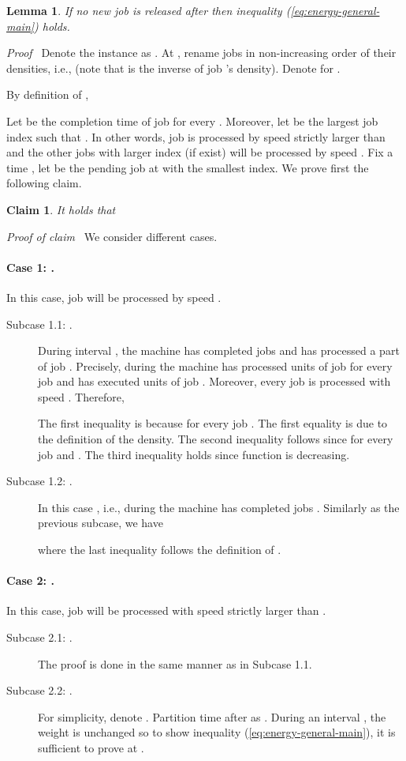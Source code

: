 \documentclass[11pt]{article}
\newenvironment{proof}{\noindent\emph{Proof\ }}{\hspace*{\fill}\medskip}
\newenvironment{claimproof}{\noindent\emph{Proof of claim\ }}{\hspace*{\fill}\medskip}
\newtheorem{lemma}{Lemma}
\newtheorem{claim}{Claim}
\begin{document}
\begin{lemma}		\label{lem:base}
If no new job is released after  then inequality (\ref{eq:energy-general-main}) holds.
\end{lemma}
\begin{proof}
Denote the instance as .
At , rename jobs in non-increasing order of their densities, i.e., 
 (note that  is the inverse of job 's density).
Denote  for .

By definition of ,


Let  be the completion time of job  for every . Moreover,
let  be the largest job index such that 
.
In other words, job  is processed by speed strictly larger than  and the other jobs
with larger index (if exist) will be processed by speed .
Fix a time , let  be the pending job at  with the smallest index.
We prove first the following claim.

\begin{claim}
It holds that

\end{claim}
\begin{claimproof}
We consider different cases.
\paragraph{Case 1: .} In this case, job  will be processed by speed .
	\begin{description}
		\item[Subcase 1.1: .]
		During interval , the machine has completed jobs  and has processed a part of job .
		Precisely, during  the machine has processed  units of job 
		for every job  and has executed  units of job .   
		Moreover, every job  is processed with speed .  
		Therefore,  

The first inequality is because  for every job .
		The first equality is due to the definition of the density.
		The second inequality follows since  for every job 
		and .
		The third inequality holds since function  is decreasing. 


		\item[Subcase 1.2: .]
		In this case , i.e., during  the machine  has completed 
		jobs . Similarly as the previous subcase, we have 

where the last inequality follows the definition of .
\end{description}

\paragraph{Case 2: .} In this case, job  will be processed with speed strictly larger than .
	\begin{description}
		\item[Subcase 2.1: .] The proof is done in the same manner as in Subcase 1.1.
\item[Subcase 2.2: .] 
		For simplicity, denote .
		Partition time after  as .  
		During an interval , the weight  is unchanged so 
		to show inequality (\ref{eq:energy-general-main}), it is sufficient to prove 
		at . 
		

\end{description}
\end{claimproof}
\end{proof}
\end{document}
